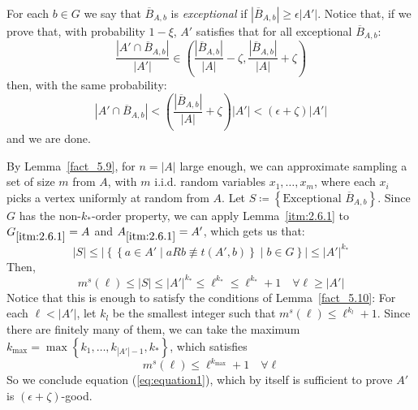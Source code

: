             \item For each $b \in G$ we say that $\overline{B}_{A,b}$ is \emph{exceptional} if
                $\left| \overline{B}_{A,b} \right| \geq \epsilon \left| A' \right|$.
                Notice that, if we prove that, with probability $1-\xi$, $A'$ satisfies that for all exceptional $\overline{B}_{A,b}$:
                $$
                    \frac{\left| A' \cap \overline{B}_{A,b} \right|}{\left| A' \right|} \in
                         \left( \frac{\left| \overline{B}_{A,b} \right|}{\left| A \right|} -
                         \zeta, \frac{\left| \overline{B}_{A,b} \right|}{\left| A \right|} + \zeta \right)
                $$
                then, with the same probability:
                \begin{equation}\label{eq:equation1}
                    \left| A' \cap \overline{B}_{A,b} \right| < \left( \frac{\left| \overline{B}_{A,b} \right|}{|A|} + \zeta \right) |A'|
                        < \left( \epsilon + \zeta \right) |A'|
                \end{equation}
                and we are done.

                By Lemma~\ref{fact_5.9}, for $n = |A|$ large enough, we can approximate sampling a set of size $m$ from $A$,
                with $m$ i.i.d. random variables $x_1, \dots, x_m$, where each $x_i$ picks a vertex uniformly at random from $A$.
                Let $S \coloneq \left\{ \text{Exceptional } \overline{B}_{A,b} \right\}$.
                Since $G$ has the non-$k_{*}$-order property, we can apply Lemma~\ref{itm:2.6.1} to $G_{\ref{itm:2.6.1}} = A$
                and $A_{\ref{itm:2.6.1}} = A'$, which gets us that:
                $$
                    |S| \leq \left|\left\{ \left\{ a \in A' \mid a R b \not\equiv t(A', b) \right\} \mid b \in G \right\} \right|
                    \leq |A'|^{k_*}
                $$
                Then,
                $$
                    m^s(\ell) \leq \left| S \right| \leq |A'|^{k_*} \leq \ell^{k_*} \leq \ell^{k_{*}} + 1 \quad \forall \ell \geq |A'|
                $$
                Notice that this is enough to satisfy the conditions of Lemma~\ref{fact_5.10}:
                For each $\ell < |A'|$, let $k_l$ be the smallest integer such that $m^s(\ell) \leq \ell^{k_l} + 1$.
                Since there are finitely many of them, we can take the maximum
                $k_{\max} = \max \left\{ k_1, \dots, k_{|A'|-1}, k_* \right\}$, which satisfies
                $$
                    m^s(\ell) \leq \ell^{k_{\max}} + 1 \quad \forall \ell
                $$
                So we conclude equation (\ref{eq:equation1}), which by itself is sufficient to prove $A'$ is
                $(\epsilon + \zeta)$-good.

